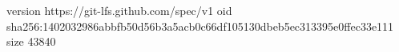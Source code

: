 version https://git-lfs.github.com/spec/v1
oid sha256:1402032986abbfb50d56b3a5acb0c66df105130dbeb5ec313395e0ffec33e111
size 43840
